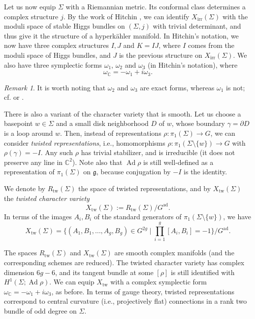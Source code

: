 \documentclass [11pt]{amsart}
\theoremstyle{remark}
\newtheorem {remark}[theorem]{Remark}
\def\cc {{\mathbb{C}}}
\def\C{\cc}
\def\del{\partial}
\def\g{\mathfrak{g}}
\def\Gad{G^{\operatorname{ad}}}
\def\Rep {R}
\def\Ad {\operatorname{Ad}}
\def\Char {X}
\def\CharIrr {\Char_{\operatorname{irr}}}
\def\Reptw{\Rep_{\operatorname{tw}}}
\def\Xtw{\Char_{\operatorname{tw}}}
\def\omegac{\omega_{\C}}
\begin{document}
Let us now equip $\Sigma$ with a Riemannian metric. Its conformal class determines a complex structure $j$. By the work of Hitchin \cite{Hitchin}, we can identify $\CharIrr(\Sigma)$ with the moduli space of stable Higgs bundles on $(\Sigma, j)$ with trivial determinant, and thus give it the structure of a hyperk\"ahler manifold. In Hitchin's notation, we now have three complex structures $I, J$ and $K=IJ$, where $I$ comes from the moduli space of Higgs bundles, and $J$ is the previous structure on $\CharIrr(\Sigma)$. We also have three symplectic forms $\omega_1$, $\omega_2$ and $\omega_3$ (in Hitchin's notation), where
$$ \omegac = -\omega_1 + i \omega_3.$$

\begin{remark}
\label{rem:exactness}
It is worth noting that $\omega_2$ and $\omega_3$ are exact forms, whereas $\omega_1$ is not; cf. \cite[p.109]{Hitchin} or \cite[Section 4.1]{KapustinWitten}.
\end{remark}

There is also a variant of the character variety that is smooth. Let us choose a basepoint $w \in \Sigma$ and a small disk neighborhood $D$ of $w$, whose boundary $\gamma = \del D$ is a loop around $w$. Then, instead of representations $\rho: \pi_1(\Sigma) \to G$, we can consider {\em twisted representations}, i.e., homomorphisms $\rho: \pi_1(\Sigma \setminus \{w\}) \to G$ with $\rho(\gamma) = -I$. Any such $\rho$ has trivial stabilizer, and is irreducible (it does not preserve any line in $\C^2$). Note also that $\Ad \rho$ is still well-defined as a representation of $\pi_1(\Sigma)$ on $\g$, because conjugation by $-I$ is the identity.

 We denote by $\Reptw(\Sigma)$ the space of twisted representations, and by $\Xtw(\Sigma)$ the {\em twisted character variety}
$$ \Xtw(\Sigma) :=  \Reptw(\Sigma)/\Gad.$$
In terms of the images $A_i, B_i$ of the standard generators of $\pi_1(\Sigma \setminus \{w\})$, we have
\begin{equation}
\label{eq:XtwAB}
 \Xtw(\Sigma) =\bigl \{ (A_1, B_1, \dots, A_g, B_g) \in G^{2g}  \mid \prod_{i=1}^g [A_i, B_i]=-1\}/\Gad.
 \end{equation}

The spaces $\Reptw(\Sigma)$ and $\Xtw(\Sigma)$ are smooth complex manifolds (and the corresponding schemes are reduced). The twisted character variety has complex dimension $6g-6$, and its tangent bundle at some $[\rho]$ is still identified with $H^1(\Sigma; \Ad \rho)$. We can equip $\Xtw$ with a complex symplectic form $\omegac = -\omega_1 + i\omega_3$, as before. In terms of gauge theory, twisted representations correspond to central curvature (i.e., projectively flat) connections in a rank two bundle of odd degree on $\Sigma$. 
\end{document}
